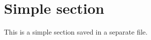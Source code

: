 \section{Simple section}
\label{sec:simple}
\begin{info}{}
	This is a simple section saved in a separate file.
\end{info}

